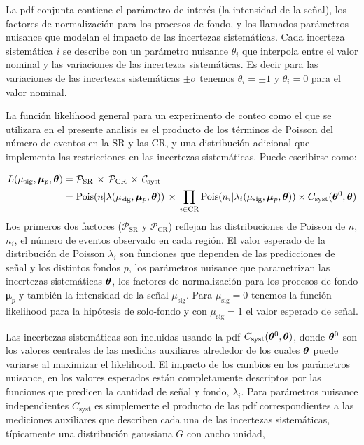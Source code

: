 La pdf conjunta contiene el parámetro de interés (la intensidad
de la señal), los factores de normalización para los procesos de fondo, y los
llamados parámetros nuisance que modelan el impacto de las incertezas
sistemáticas. Cada incerteza sistemática $i$ se describe con un parámetro
nuisance $\theta_i$ que interpola entre el valor nominal y las variaciones de
las incertezas sistemáticas. Es decir para las variaciones de las incertezas
sistemáticas $\pm \sigma$ tenemos $\theta_i = \pm 1$ y $\theta_i = 0$ para el
valor nominal.

La función likelihood general para un experimento de conteo como el que se utilizara
en el presente analisis es el producto de los términos de Poisson del
número de eventos en la SR y las CR, y una distribución adicional que implementa
las restricciones en las incertezas sistemáticas. Puede escribirse como:

\begin{align}
  L(\mu_\text{sig}, \bm{\mu}_p, \bm{\theta}) &= \mathcal{P}_\text{SR} \, \times \, \mathcal{P}_\text{CR} \, \times \,
  \mathcal{C}_\text{syst} \nonumber \\
  &= \operatorname{Pois}(n|\lambda(\mu_\text{sig}, \bm{\mu}_p, \bm{\theta})) \, \times \, \prod_{i \in \text{CR}}
  \operatorname{Pois}(n_i|\lambda_i(\mu_\text{sig}, \bm{\mu}_p, \bm{\theta})) \times C_\text{syst} (\bm{\theta}^0, \bm{\theta})
\end{align}
%
Los primeros dos factores ($\mathcal{P}_\text{SR}$ y $\mathcal{P}_\text{CR}$)
reflejan las distribuciones de Poisson de $n$, $n_i$, el número de eventos observado
en cada región. El valor esperado de la distribución de Poisson $\lambda_i$ son
funciones que dependen de las predicciones de señal y los distintos fondos $p$,
los parámetros nuisance que parametrizan las incertezas sistemáticas $\bm{\theta}$,
los factores de normalización para los procesos de fondo $\bm{\mu}_p$ y también
la intensidad de la señal $\mu_\text{sig}$. Para $\mu_\text{sig} = 0$ tenemos la
función likelihood para la hipótesis de solo-fondo y con $\mu_\text{sig} = 1$ el
valor esperado de señal. %

Las incertezas sistemáticas son incluidas usando la pdf
$C_\text{syst}(\bm{\theta}^0, \bm{\theta})$, donde $\bm{\theta}^0$ son los valores centrales
de las medidas auxiliares alrededor de los cuales $\bm{\theta}$ puede variarse al
maximizar el likelihood. El impacto de los cambios en los parámetros nuisance,
en los valores esperados están completamente descriptos por las funciones que
predicen la cantidad de señal y fondo, $\lambda_i$. Para parámetros nuisance
independientes $C_\text{syst}$ es simplemente el producto de las pdf
correspondientes a las mediciones auxiliares que describen cada una de las
incertezas sistemáticas, típicamente una distribución gaussiana $G$ con ancho
unidad,

